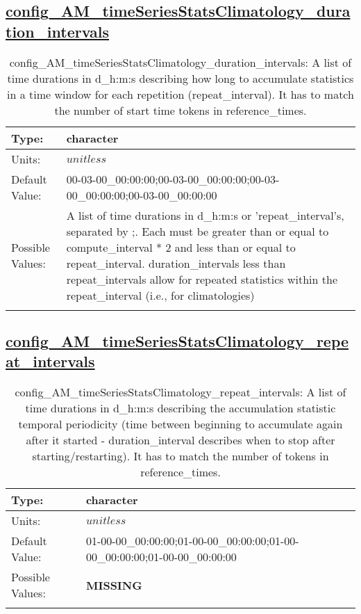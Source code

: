 \subsection[config\_AM\_timeSeriesStatsClimatology\_duration\_intervals]{\hyperref[sec:nm_tab_AM_timeSeriesStatsClimatology]{config\_AM\_timeSeriesStatsClimatology\_duration\_intervals}}
\label{subsec:nm_sec_config_AM_timeSeriesStatsClimatology_duration_intervals}
\begin{center}
\begin{longtable}{| p{2.0in} || p{4.0in} |}
    \hline
    Type: & character \\
    \hline
    Units: & $unitless$ \\
    \hline
    Default Value: & 00-03-00\_00:00:00;00-03-00\_00:00:00;00-03-00\_00:00:00;00-03-00\_00:00:00 \\
    \hline
    Possible Values: & A list of time durations in d\_h:m:s or 'repeat\_interval's, separated by ;. Each must be greater than or equal to compute\_interval * 2 and less than or equal to repeat\_interval. duration\_intervals less than repeat\_intervals allow for repeated statistics within the repeat\_interval (i.e., for climatologies) \\
    \hline
    \caption{config\_AM\_timeSeriesStatsClimatology\_duration\_intervals: A list of time durations in d\_h:m:s describing how long to accumulate statistics in a time window for each repetition (repeat\_interval). It has to match the number of start time tokens in reference\_times.}
\end{longtable}
\end{center}
\subsection[config\_AM\_timeSeriesStatsClimatology\_repeat\_intervals]{\hyperref[sec:nm_tab_AM_timeSeriesStatsClimatology]{config\_AM\_timeSeriesStatsClimatology\_repeat\_intervals}}
\label{subsec:nm_sec_config_AM_timeSeriesStatsClimatology_repeat_intervals}
\begin{center}
\begin{longtable}{| p{2.0in} || p{4.0in} |}
    \hline
    Type: & character \\
    \hline
    Units: & $unitless$ \\
    \hline
    Default Value: & 01-00-00\_00:00:00;01-00-00\_00:00:00;01-00-00\_00:00:00;01-00-00\_00:00:00 \\
    \hline
    Possible Values: & {\bf \color{red} MISSING} \\
    \hline
    \caption{config\_AM\_timeSeriesStatsClimatology\_repeat\_intervals: A list of time durations in d\_h:m:s describing the accumulation statistic temporal periodicity (time between beginning to accumulate again after it started - duration\_interval describes when to stop after starting/restarting). It has to match the number of tokens in reference\_times.}
\end{longtable}
\end{center}
